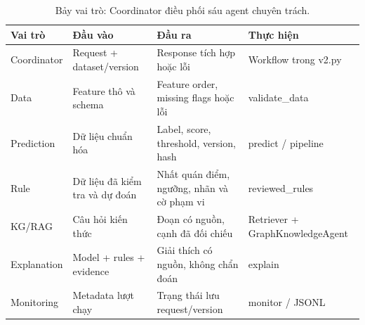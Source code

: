 \par\FloatBarrier\begin{table}[H]\centering\small{}\setlength{\tabcolsep}{5pt}
\caption{Bảy vai trò: Coordinator điều phối sáu agent chuyên trách.}\begin{tabular}{P{2.2cm}P{4.1cm}P{4.1cm}P{3.1cm}}\toprule
Vai trò & Đầu vào & Đầu ra & Thực hiện\\\midrule
Coordinator & Request + dataset/version & Response tích hợp hoặc lỗi & Workflow trong v2.py\\
Data & Feature thô và schema & Feature order, missing flags hoặc lỗi & validate\_data\\
Prediction & Dữ liệu chuẩn hóa & Label, score, threshold, version, hash & predict / pipeline\\
Rule & Dữ liệu đã kiểm tra và dự đoán & Nhất quán điểm, ngưỡng, nhãn và cờ phạm vi & reviewed\_rules\\
KG/RAG & Câu hỏi kiến thức & Đoạn có nguồn, cạnh đã đối chiếu & Retriever + GraphKnowledgeAgent\\
Explanation & Model + rules + evidence & Giải thích có nguồn, không chẩn đoán & explain\\
Monitoring & Metadata lượt chạy & Trạng thái lưu request/version & monitor / JSONL\\\bottomrule\end{tabular}\end{table}
